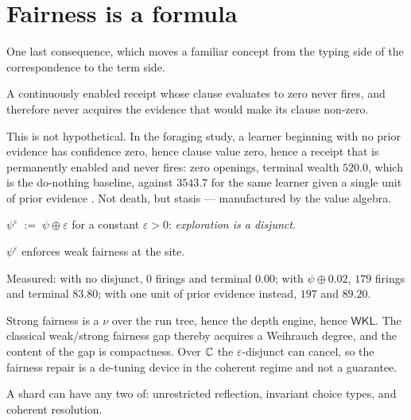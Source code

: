 \section{Fairness is a formula}
\label{sec:fairness}

One last consequence, which moves a familiar concept from the typing side of the
correspondence to the term side.

\begin{proposition}
\label{prop:zeroabsorb}
A continuously enabled receipt whose clause evaluates to zero never fires, and
therefore never acquires the evidence that would make its clause non-zero.
\end{proposition}

This is not hypothetical. In the foraging study, a learner beginning with no prior
evidence has confidence zero, hence clause value zero, hence a receipt that is
permanently enabled and never fires: zero openings, terminal wealth $520.0$, which
is the do-nothing baseline, against $3543.7$ for the same learner given a single
unit of prior evidence \cite{GradedWhere}. Not death, but stasis --- manufactured
by the value algebra.

\begin{definition}
\label{def:explore}
$\psi^{\varepsilon} \;:=\; \psi \oplus \varepsilon$ for a constant
$\varepsilon > 0$: \emph{exploration is a disjunct}.
\end{definition}

\begin{proposition}
\label{prop:weakfair}
$\psi^{\varepsilon}$ enforces weak fairness at the site.
\end{proposition}

Measured: with no disjunct, $0$ firings and terminal $0.00$; with
$\psi \oplus 0.02$, $179$ firings and terminal $83.80$; with one unit of prior
evidence instead, $197$ and $89.20$.

\begin{remark}
Strong fairness is a $\nu$ over the run tree, hence the depth engine, hence
$\mathsf{WKL}$. The classical weak/strong fairness gap thereby acquires a
Weihrauch degree, and the content of the gap is compactness. Over $\mathbb{C}$ the
$\varepsilon$-disjunct can cancel, so the fairness repair is a de-tuning device in
the coherent regime and not a guarantee.
\end{remark}

\begin{slogan}
A shard can have any two of: unrestricted reflection, invariant choice types, and
coherent resolution.
\end{slogan}
